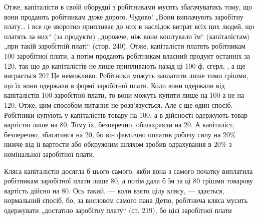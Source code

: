 Отже, капіталісти в своїй оборудці з робітниками мусять збагачуватись
тому, що вони продають робітникам дуже дорого. Чудово! „Вони
виплачують заробітну плату\dots{} і все це зворотно припливає до них в наслідок
витрат всіх цих людей, що платять за них“ (за продукти) „дорожче,
ніж вони коштували їм“ (капіталістам) „при такій заробітній
платі“ (стор. 240). Отже, капіталісти платять робітникам 100 заробітної плати, а потім продають робітникам власний продукт
останніх за 120, так що до капіталістів не лише припливають
назад ці 100 ф. сгерл, , а ще виграється 20? Це неможливо.
Робітники можуть заплатити лише тими грішми, що їх вони одержали
в формі заробітної плати. Коли вони одержали від капіталістів 100 заробітної плати, то вони можуть купити лише на 100
а не на 120. Отже, цим способом питання не розв’язується. Але
є ще один спосіб. Робітники купують у капіталістів товару на 100, а в дійсності одержують товар вартістю лише на 80.
Тому їх, безперечно, обшахраяли на 20. А капіталіст, безперечно,
збагатився на 20, бо він фактично оплатив робочу силу
на 20\% нижче від її вартости або обкружним шляхом зробив одрахування
в 20\% з номінальної заробітної плати.

Кляса капіталістів досягла б цього самого, якби вона з самого початку
виплатила робітникам заробітної плати лише 80, а потім
дала б їм за ці 80 грішми товарову вартість дійсно на 80. Ось такий, — коли взяти цілу клясу, — здається, нормальний спосіб,
бо, за висловом самого пана Детю, робітнича кляса мусить одержувати
„достатню заробітну плату“ (ст. 219), бо цієї заробітної плати
\parbreak{}  %
